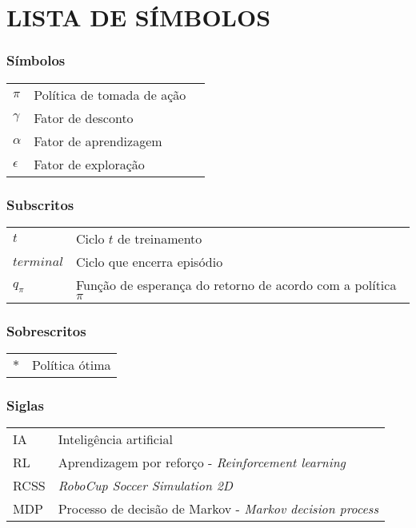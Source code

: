 




\chapter*{LISTA DE SÍMBOLOS}



\subsection*{Símbolos}

\begin{tabular}{p{}p{}>{\PreserveBacklash\raggedleft}p{}}
$\pi$ & Política de tomada de ação \tabularnewline
$\gamma$ & Fator de desconto \tabularnewline
$\alpha$ & Fator de aprendizagem \tabularnewline
$\epsilon$ & Fator de exploração \tabularnewline
\end{tabular}

\subsection*{Subscritos}

\begin{tabular}{p{}p{}}
$t$  & Ciclo $t$ de treinamento \tabularnewline
$terminal$  & Ciclo que encerra episódio \tabularnewline
$q_\pi$ & Função de esperança do retorno de acordo com a política $\pi$ \tabularnewline
\end{tabular}

\subsection*{Sobrescritos}

\begin{tabular}{p{}p{}}
	$*$  & Política ótima \tabularnewline
\end{tabular}

\subsection*{Siglas}

\begin{tabular}{p{}p{}}
IA  & Inteligência artificial\tabularnewline
RL & Aprendizagem por reforço - \textit{Reinforcement learning} \tabularnewline
RCSS & \textit{RoboCup Soccer Simulation 2D}\tabularnewline
MDP & Processo de decisão de Markov - \textit{Markov decision process}\tabularnewline
\end{tabular}
